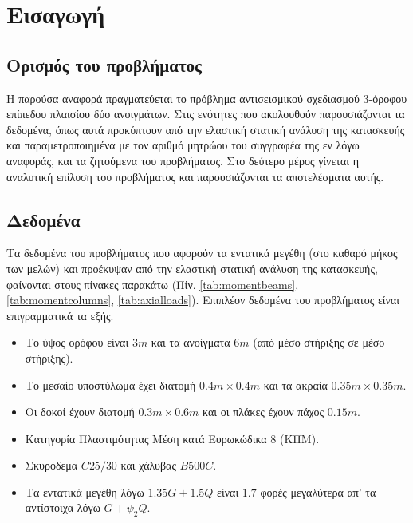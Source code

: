 \pagestyle{fancy}
\chapter{Εισαγωγή}
\section{Ορισμός του προβλήματος}
Η παρούσα αναφορά πραγματεύεται το πρόβλημα αντισεισμικού σχεδιασμού 3-όροφου επίπεδου πλαισίου δύο ανοιγμάτων. Στις ενότητες που ακολουθούν παρουσιάζονται τα δεδομένα, όπως αυτά προκύπτουν από την ελαστική στατική ανάλυση της κατασκευής και παραμετροποιημένα με τον αριθμό μητρώου του συγγραφέα της εν λόγω αναφοράς, και τα ζητούμενα του προβλήματος. Στο δεύτερο μέρος γίνεται η αναλυτική επίλυση του προβλήματος και παρουσιάζονται τα αποτελέσματα αυτής.

\section{Δεδομένα}
Τα δεδομένα του προβλήματος που αφορούν τα εντατικά μεγέθη (στο καθαρό μήκος των μελών) και προέκυψαν από την ελαστική στατική ανάλυση της κατασκευής, φαίνονται στους πίνακες παρακάτω (Πίν. \ref{tab:momentbeams}, \ref{tab:momentcolumns}, \ref{tab:axialloads}). Επιπλέον δεδομένα του προβλήματος είναι επιγραμματικά τα εξής.

\begin{itemize}
  \item Το ύψος ορόφου είναι $3m$ και τα ανοίγματα $6m$ (από μέσο στήριξης σε μέσο στήριξης).
  \item Το μεσαίο υποστύλωμα έχει διατομή $0.4m\times0.4m$ και τα ακραία $0.35m\times0.35m$.
  \item Οι δοκοί έχουν διατομή $0.3m\times0.6m$ και οι πλάκες έχουν πάχος $0.15m$.
  \item Κατηγορία Πλαστιμότητας Μέση κατά Ευρωκώδικα $8$ (ΚΠΜ).
  \item Σκυρόδεμα $C25/30$ και χάλυβας $B500C$.
  \item Τα εντατικά μεγέθη λόγω $1.35G+1.5Q$ είναι $1.7$ φορές
μεγαλύτερα απ' τα αντίστοιχα λόγω $G+\psi_2Q$.
\end{itemize}

